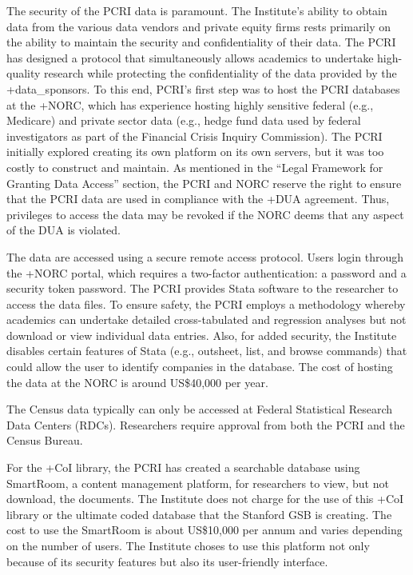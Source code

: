 \documentclass[
]{book}
\begin{document}
The security of the PCRI data is paramount. The Institute's ability to obtain data from the various data vendors and private equity firms rests primarily on the ability to maintain the security and confidentiality of their data. The PCRI has designed a protocol that simultaneously allows academics to undertake high-quality research while protecting the confidentiality of the data provided by the +data\_sponsors\textbar. To this end, PCRI's first step was to host the PCRI databases at the +NORC\textbar, which has experience hosting highly sensitive federal (e.g., Medicare) and private sector data (e.g., hedge fund data used by federal investigators as part of the Financial Crisis Inquiry Commission). The PCRI initially explored creating its own platform on its own servers, but it was too costly to construct and maintain. As mentioned in the ``Legal Framework for Granting Data Access'' section, the PCRI and NORC reserve the right to ensure that the PCRI data are used in compliance with the +DUA\textbar{} agreement. Thus, privileges to access the data may be revoked if the NORC deems that any aspect of the DUA is violated.

The data are accessed using a secure remote access protocol. Users login through the +NORC\textbar{} portal, which requires a two-factor authentication: a password and a security token password. The PCRI provides Stata software to the researcher to access the data files. To ensure safety, the PCRI employs a methodology whereby academics can undertake detailed cross-tabulated and regression analyses but not download or view individual data entries. Also, for added security, the Institute disables certain features of Stata (e.g., outsheet, list, and browse commands) that could allow the user to identify companies in the database. The cost of hosting the data at the NORC is around US\$40,000 per year.

The Census data typically can only be accessed at Federal Statistical Research Data Centers (RDCs). Researchers require approval from both the PCRI and the Census Bureau.

For the +CoI\textbar{} library, the PCRI has created a searchable database using SmartRoom, a content management platform, for researchers to view, but not download, the documents. The Institute does not charge for the use of this +CoI\textbar{} library or the ultimate coded database that the Stanford GSB is creating. The cost to use the SmartRoom is about US\$10,000 per annum and varies depending on the number of users. The Institute choses to use this platform not only because of its security features but also its user-friendly interface.
\end{document}
